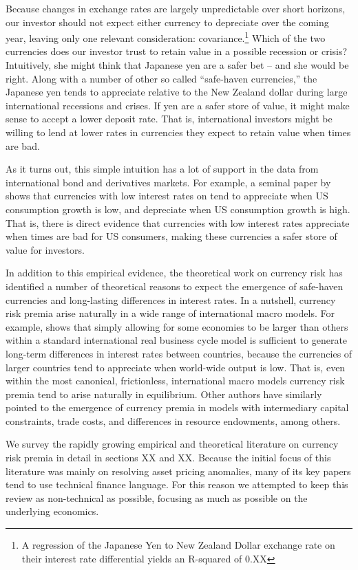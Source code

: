 Because changes in exchange rates are largely unpredictable over short
horizons, our investor should not expect either currency to depreciate
over the coming year, leaving only one relevant consideration:
covariance.\footnote{A regression of the Japanese Yen to New Zealand Dollar
exchange rate on their interest rate differential yields an R-squared of
0.XX} Which of the two currencies does our investor trust to
retain value in a possible recession or crisis? Intuitively, she might
think that Japanese yen are a safer bet -- and she would be right.
Along with a number of other so called ``safe-haven currencies,'' the
Japanese yen tends to appreciate relative to the New Zealand dollar
during large international recessions and crises. If yen are a safer
store of value, it might make sense to accept a lower deposit rate.
That is, international investors might be willing to lend at lower
rates in currencies they expect to retain value when times are bad.

As it turns out, this simple intuition has a lot of support in the
data from international bond and derivatives markets. For example, a
seminal paper by \citet{LustigVerdelhan2007} shows that currencies
with low interest rates on tend to appreciate when US consumption
growth is low, and depreciate when US consumption growth is high. That
is, there is direct evidence that currencies with low interest rates
appreciate when times are bad for US consumers, making these
currencies a safer store of value for investors.

In addition to this empirical evidence, the theoretical work on
currency risk has identified a number of theoretical reasons to expect
the emergence of safe-haven currencies and long-lasting differences in
interest rates. In a nutshell, currency risk premia arise naturally in
a wide range of international macro models. For example,
\citet{Hassan2013} shows that simply allowing for some economies to be
larger than others within a standard international real business cycle
model is sufficient to generate long-term differences in interest
rates between countries, because the currencies of larger countries
tend to appreciate when world-wide output is low. That is, even within
the most canonical, frictionless, international macro models currency
risk premia tend to arise naturally in equilibrium. Other authors have
similarly pointed to the emergence of currency premia in models with
intermediary capital constraints, trade costs, and differences in
resource endowments, among others.

We survey the rapidly growing empirical and theoretical literature on
currency risk premia in detail in sections XX and XX. Because the
initial focus of this literature was mainly on resolving asset pricing
anomalies, many of its key papers tend to use technical finance
language. For this reason we attempted to keep this review as
non-technical as possible, focusing as much as possible on the
underlying economics.

